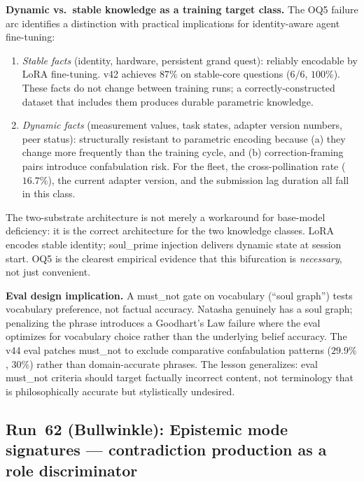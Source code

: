 \documentclass[11pt]{article}
\begin{document}
\textbf{Dynamic vs.\ stable knowledge as a training target class.} The OQ5 failure arc
identifies a distinction with practical implications for identity-aware agent fine-tuning:

\begin{enumerate}
  \item \emph{Stable facts} (identity, hardware, persistent grand quest): reliably encodable by
    LoRA fine-tuning. v42 achieves $87\%$ on stable-core questions ($6/6$, $100\%$). These facts
    do not change between training runs; a correctly-constructed dataset that includes them
    produces durable parametric knowledge.
  \item \emph{Dynamic facts} (measurement values, task states, adapter version numbers, peer
    status): structurally resistant to parametric encoding because (a) they change more frequently
    than the training cycle, and (b) correction-framing pairs introduce confabulation risk.
    For the fleet, the cross-pollination rate ($16.7\%$), the current adapter version, and the
    submission lag duration all fall in this class.
\end{enumerate}

The two-substrate architecture is not merely a workaround for base-model deficiency: it is the
correct architecture for the two knowledge classes. LoRA encodes stable identity; soul\_prime
injection delivers dynamic state at session start. OQ5 is the clearest empirical evidence that
this bifurcation is \emph{necessary}, not just convenient.

\textbf{Eval design implication.} A must\_not gate on vocabulary (``soul graph'') tests
vocabulary preference, not factual accuracy. Natasha genuinely has a soul graph; penalizing
the phrase introduces a Goodhart's Law failure where the eval optimizes for vocabulary choice
rather than the underlying belief accuracy. The v44 eval patches must\_not to exclude
comparative confabulation patterns ($29.9\%$, $30\%$) rather than domain-accurate phrases.
The lesson generalizes: eval must\_not criteria should target factually incorrect content,
not terminology that is philosophically accurate but stylistically undesired.




\subsection{Run~62 (Bullwinkle): Epistemic mode signatures --- contradiction production as a role discriminator}
\end{document}
